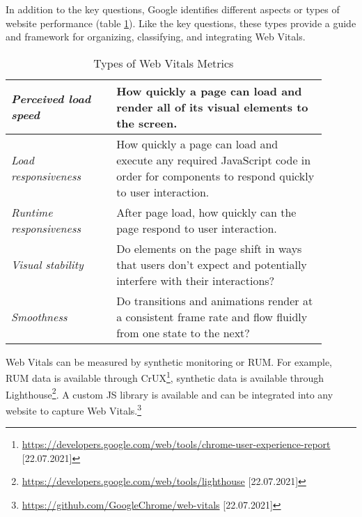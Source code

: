 
In addition to the key questions, Google identifies different aspects or types of website performance (table \ref{table:web_vitals_types}).
Like the key questions, these types provide a guide and framework for organizing, classifying, and integrating Web Vitals. %


\begin{table}[h]
	\small
	\centering
	\begin{tabular}{ p{0.3\linewidth} | p{0.6\linewidth} }
	\textit{Perceived load speed} & How quickly a page can load and render all of its visual elements to the screen. \\
	\hline
	\textit{Load responsiveness} & How quickly a page can load and execute any required JavaScript code in order for components to respond quickly to user interaction. \\
	\hline
	\textit{Runtime responsiveness} & After page load, how quickly can the page respond to user interaction. \\
	\hline
	\textit{Visual stability} & Do elements on the page shift in ways that users don't expect and potentially interfere with their interactions? \\
	\hline
	\textit{Smoothness} & Do transitions and animations render at a consistent frame rate and flow fluidly from one state to the next? \\
	\end{tabular}
	\medskip
	\caption{Types of Web Vitals Metrics}
	\label{table:web_vitals_types}
\end{table}



Web Vitals can be measured by synthetic monitoring or RUM. %
For example, RUM data is available through CrUX\footnote{\url{https://developers.google.com/web/tools/chrome-user-experience-report} [22.07.2021]}, synthetic data is available through Lighthouse\footnote{\url{https://developers.google.com/web/tools/lighthouse} [22.07.2021]}.
A custom JS library is available and can be integrated into any website to capture Web Vitals.\footnote{\url{https://github.com/GoogleChrome/web-vitals} [22.07.2021]}


